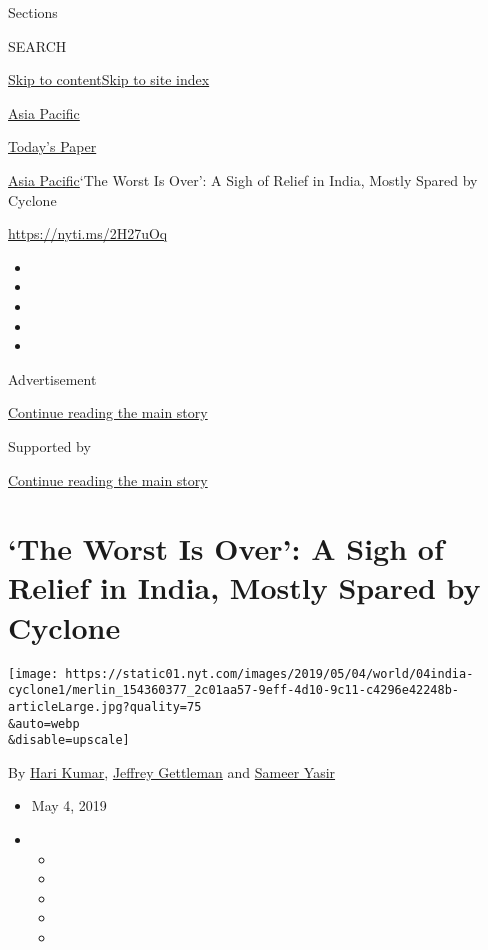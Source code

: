 Sections

SEARCH

\protect\hyperlink{site-content}{Skip to
content}\protect\hyperlink{site-index}{Skip to site index}

\href{https://www.nytimes.com/section/world/asia}{Asia Pacific}

\href{https://myaccount.nytimes.com/auth/login?response_type=cookie\&client_id=vi}{}

\href{https://www.nytimes.com/section/todayspaper}{Today's Paper}

\href{/section/world/asia}{Asia Pacific}\textbar{}`The Worst Is Over': A
Sigh of Relief in India, Mostly Spared by Cyclone

\url{https://nyti.ms/2H27uOq}

\begin{itemize}
\item
\item
\item
\item
\item
\end{itemize}

Advertisement

\protect\hyperlink{after-top}{Continue reading the main story}

Supported by

\protect\hyperlink{after-sponsor}{Continue reading the main story}

\hypertarget{the-worst-is-over-a-sigh-of-relief-in-india-mostly-spared-by-cyclone}{%
\section{`The Worst Is Over': A Sigh of Relief in India, Mostly Spared
by
Cyclone}\label{the-worst-is-over-a-sigh-of-relief-in-india-mostly-spared-by-cyclone}}

\texttt{[image: https://static01.nyt.com/images/2019/05/04/world/04india-cyclone1/merlin\_154360377\_2c01aa57-9eff-4d10-9c11-c4296e42248b-articleLarge.jpg?quality=75\\\&auto=webp\\\&disable=upscale]}

By \href{https://www.nytimes.com/by/hari-kumar}{Hari Kumar},
\href{https://www.nytimes.com/by/jeffrey-gettleman}{Jeffrey Gettleman}
and \href{https://www.nytimes.com/by/sameer-yasir}{Sameer Yasir}

\begin{itemize}
\item
  May 4, 2019
\item
  \begin{itemize}
  \item
  \item
  \item
  \item
  \item
  \end{itemize}
\end{itemize}

